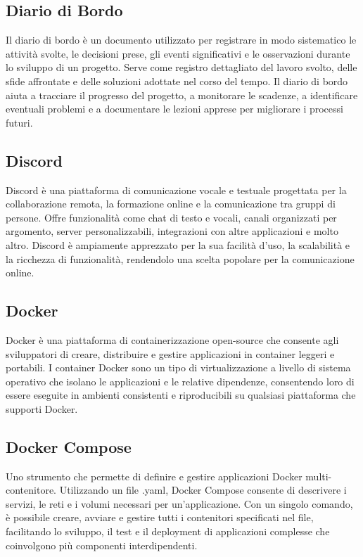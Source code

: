 \subsection*{Diario di Bordo} 
Il diario di bordo è un documento utilizzato per registrare in modo sistematico le attività svolte, le decisioni prese, gli eventi significativi e le osservazioni durante lo sviluppo di un progetto. Serve come registro dettagliato del lavoro svolto, delle sfide affrontate e delle soluzioni adottate nel corso del tempo. Il diario di bordo aiuta a tracciare il progresso del progetto, a monitorare le scadenze, a identificare eventuali problemi e a documentare le lezioni apprese per migliorare i processi futuri.
\subsection*{Discord} 
Discord è una piattaforma di comunicazione vocale e testuale progettata per la collaborazione remota, la formazione online e la comunicazione tra gruppi di persone. Offre funzionalità come chat di testo e vocali, canali organizzati per argomento, server personalizzabili, integrazioni con altre applicazioni e molto altro. Discord è ampiamente apprezzato per la sua facilità d'uso, la scalabilità e la ricchezza di funzionalità, rendendolo una scelta popolare per la comunicazione online.
\subsection*{Docker} 
Docker è una piattaforma di containerizzazione open-source che consente agli sviluppatori di creare, distribuire e gestire applicazioni in container leggeri e portabili. I container Docker sono un tipo di virtualizzazione a livello di sistema operativo che isolano le applicazioni e le relative dipendenze, consentendo loro di essere eseguite in ambienti consistenti e riproducibili su qualsiasi piattaforma che supporti Docker.
\subsection*{Docker Compose} 
Uno strumento che permette di definire e gestire applicazioni Docker multi-contenitore. Utilizzando un file .yaml, Docker Compose consente di descrivere i servizi, le reti e i volumi necessari per un'applicazione. Con un singolo comando, è possibile creare, avviare e gestire tutti i contenitori specificati nel file, facilitando lo sviluppo, il test e il deployment di applicazioni complesse che coinvolgono più componenti interdipendenti.
